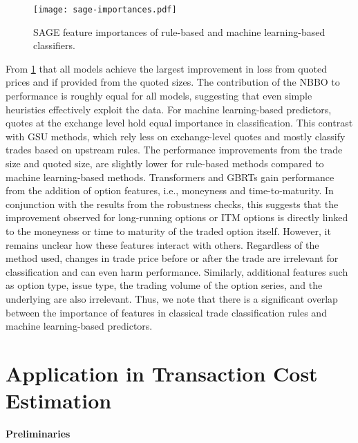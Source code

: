 \begin{figure}[h!]
    \centering
    \texttt{[image: sage-importances.pdf]}
    \caption[ Feature Importances For Classifiers]{\gls{SAGE} feature importances of rule-based and machine learning-based classifiers.}
    \label{fig:sage-importances}
\end{figure}

From \cref{fig:sage-importances} that all models achieve the largest improvement in loss from quoted prices and if provided from the quoted sizes. The contribution of the \gls{NBBO} to performance is roughly equal for all models, suggesting that even simple heuristics effectively exploit the data. For machine learning-based predictors, quotes at the exchange level hold equal importance in classification. This contrast with \gls{GSU} methods, which rely less on exchange-level quotes and mostly classify trades based on upstream rules. The performance improvements from the trade size and quoted size, are slightly lower for rule-based methods compared to machine learning-based methods.  Transformers and \glspl{GBRT} gain performance from the addition of option features, i.e., moneyness and time-to-maturity. In conjunction with the results from the robustness checks, this suggests that the improvement observed for long-running options or \gls{ITM} options is directly linked to the moneyness or time to maturity of the traded option itself. However, it remains unclear how these features interact with others. Regardless of the method used, changes in trade price before or after the trade are irrelevant for classification and can even harm performance. Similarly, additional features such as option type, issue type, the trading volume of the option series, and the underlying are also irrelevant. Thus, we note that there is a significant overlap between the importance of features in classical trade classification rules and machine learning-based predictors.

\clearpage

\section{Application in Transaction Cost Estimation}\label{sec:application}

\textbf{Preliminaries}



